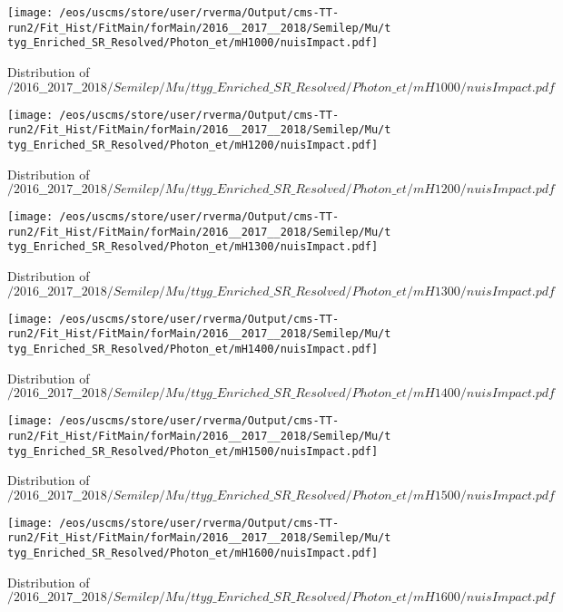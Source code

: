 \begin{figure}
\centering
\texttt{[image: /eos/uscms/store/user/rverma/Output/cms-TT-run2/Fit\_Hist/FitMain/forMain/2016\_\_2017\_\_2018/Semilep/Mu/ttyg\_Enriched\_SR\_Resolved/Photon\_et/mH1000/nuisImpact.pdf]}
\caption{Distribution of $/2016\_\_2017\_\_2018/Semilep/Mu/ttyg\_Enriched\_SR\_Resolved/Photon\_et/mH1000/nuisImpact.pdf$}
\end{figure}

\begin{figure}
\centering
\texttt{[image: /eos/uscms/store/user/rverma/Output/cms-TT-run2/Fit\_Hist/FitMain/forMain/2016\_\_2017\_\_2018/Semilep/Mu/ttyg\_Enriched\_SR\_Resolved/Photon\_et/mH1200/nuisImpact.pdf]}
\caption{Distribution of $/2016\_\_2017\_\_2018/Semilep/Mu/ttyg\_Enriched\_SR\_Resolved/Photon\_et/mH1200/nuisImpact.pdf$}
\end{figure}

\begin{figure}
\centering
\texttt{[image: /eos/uscms/store/user/rverma/Output/cms-TT-run2/Fit\_Hist/FitMain/forMain/2016\_\_2017\_\_2018/Semilep/Mu/ttyg\_Enriched\_SR\_Resolved/Photon\_et/mH1300/nuisImpact.pdf]}
\caption{Distribution of $/2016\_\_2017\_\_2018/Semilep/Mu/ttyg\_Enriched\_SR\_Resolved/Photon\_et/mH1300/nuisImpact.pdf$}
\end{figure}

\begin{figure}
\centering
\texttt{[image: /eos/uscms/store/user/rverma/Output/cms-TT-run2/Fit\_Hist/FitMain/forMain/2016\_\_2017\_\_2018/Semilep/Mu/ttyg\_Enriched\_SR\_Resolved/Photon\_et/mH1400/nuisImpact.pdf]}
\caption{Distribution of $/2016\_\_2017\_\_2018/Semilep/Mu/ttyg\_Enriched\_SR\_Resolved/Photon\_et/mH1400/nuisImpact.pdf$}
\end{figure}

\begin{figure}
\centering
\texttt{[image: /eos/uscms/store/user/rverma/Output/cms-TT-run2/Fit\_Hist/FitMain/forMain/2016\_\_2017\_\_2018/Semilep/Mu/ttyg\_Enriched\_SR\_Resolved/Photon\_et/mH1500/nuisImpact.pdf]}
\caption{Distribution of $/2016\_\_2017\_\_2018/Semilep/Mu/ttyg\_Enriched\_SR\_Resolved/Photon\_et/mH1500/nuisImpact.pdf$}
\end{figure}

\begin{figure}
\centering
\texttt{[image: /eos/uscms/store/user/rverma/Output/cms-TT-run2/Fit\_Hist/FitMain/forMain/2016\_\_2017\_\_2018/Semilep/Mu/ttyg\_Enriched\_SR\_Resolved/Photon\_et/mH1600/nuisImpact.pdf]}
\caption{Distribution of $/2016\_\_2017\_\_2018/Semilep/Mu/ttyg\_Enriched\_SR\_Resolved/Photon\_et/mH1600/nuisImpact.pdf$}
\end{figure}

